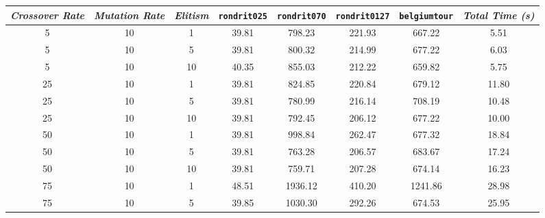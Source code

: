 
\begin{table}[h]
\centering
\footnotesize
{\renewcommand{\arraystretch}{1}}
\begin{tabular}{ccc|c|c|c|c|c}
\textit{Crossover Rate} & \textit{Mutation Rate} & \textit{Elitism} & \texttt{rondrit025} & \texttt{rondrit070} & \texttt{rondrit0127} & \texttt{belgiumtour} & \textit{Total Time (s)} \\\hline
5 & 10 & 1 & \cellcolor{gray!50}39.81 & \cellcolor{gray!38}798.23 & \cellcolor{gray!8}221.93 & \cellcolor{gray!48}667.22 & 5.51\\
5 & 10 & 5 & \cellcolor{gray!50}39.81 & \cellcolor{gray!38}800.32 & \cellcolor{gray!15}214.99 & \cellcolor{gray!45}677.22 & 6.03\\
5 & 10 & 10 & \cellcolor{gray!45}40.35 & \cellcolor{gray!29}855.03 & \cellcolor{gray!17}212.22 & \cellcolor{gray!50}659.82 & 5.75\\
25 & 10 & 1 & \cellcolor{gray!50}39.81 & \cellcolor{gray!34}824.85 & \cellcolor{gray!9}220.84 & \cellcolor{gray!45}679.12 & 11.80\\
25 & 10 & 5 & \cellcolor{gray!50}39.81 & \cellcolor{gray!41}780.99 & \cellcolor{gray!14}216.14 & \cellcolor{gray!36}708.19 & 10.48\\
25 & 10 & 10 & \cellcolor{gray!50}39.81 & \cellcolor{gray!39}792.45 & \cellcolor{gray!23}206.12 & \cellcolor{gray!45}677.22 & 10.00\\
50 & 10 & 1 & \cellcolor{gray!50}39.81 & \cellcolor{gray!5}998.84 & \cellcolor{gray!1}262.47 & \cellcolor{gray!45}677.32 & 18.84\\
50 & 10 & 5 & \cellcolor{gray!50}39.81 & \cellcolor{gray!44}763.28 & \cellcolor{gray!23}206.57 & \cellcolor{gray!43}683.67 & 17.24\\
50 & 10 & 10 & \cellcolor{gray!50}39.81 & \cellcolor{gray!45}759.71 & \cellcolor{gray!22}207.28 & \cellcolor{gray!46}674.14 & 16.23\\
75 & 10 & 1 & \cellcolor{gray!1}48.51 & \cellcolor{gray!1}1936.12 & \cellcolor{gray!1}410.20 & \cellcolor{gray!1}1241.86 & 28.98\\
75 & 10 & 5 & \cellcolor{gray!50}39.85 & \cellcolor{gray!1}1030.30 & \cellcolor{gray!1}292.26 & \cellcolor{gray!46}674.53 & 25.95\\

\end{tabular}
\end{table}
